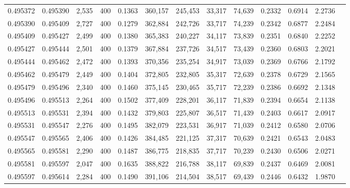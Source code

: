 \begin{tabular}{rrrrrrrrrrrrr}
0.495372 & 0.495390 &  2,535 & 400 &                                     0.1363 & 360,157 & 245,453 &  33,317 &  74,639 & 0.2332 & 0.6914 & 2.2736 \\
0.495390 & 0.495409 &  2,727 & 400 &                                     0.1279 & 362,884 & 242,726 &  33,717 &  74,239 & 0.2342 & 0.6877 & 2.2484 \\
0.495409 & 0.495427 &  2,499 & 400 &                                     0.1380 & 365,383 & 240,227 &  34,117 &  73,839 & 0.2351 & 0.6840 & 2.2252 \\
0.495427 & 0.495444 &  2,501 & 400 &                                     0.1379 & 367,884 & 237,726 &  34,517 &  73,439 & 0.2360 & 0.6803 & 2.2021 \\
0.495444 & 0.495462 &  2,472 & 400 &                                     0.1393 & 370,356 & 235,254 &  34,917 &  73,039 & 0.2369 & 0.6766 & 2.1792 \\
0.495462 & 0.495479 &  2,449 & 400 &                                     0.1404 & 372,805 & 232,805 &  35,317 &  72,639 & 0.2378 & 0.6729 & 2.1565 \\
0.495479 & 0.495496 &  2,340 & 400 &                                     0.1460 & 375,145 & 230,465 &  35,717 &  72,239 & 0.2386 & 0.6692 & 2.1348 \\
0.495496 & 0.495513 &  2,264 & 400 &                                     0.1502 & 377,409 & 228,201 &  36,117 &  71,839 & 0.2394 & 0.6654 & 2.1138 \\
0.495513 & 0.495531 &  2,394 & 400 &                                     0.1432 & 379,803 & 225,807 &  36,517 &  71,439 & 0.2403 & 0.6617 & 2.0917 \\
0.495531 & 0.495547 &  2,276 & 400 &                                     0.1495 & 382,079 & 223,531 &  36,917 &  71,039 & 0.2412 & 0.6580 & 2.0706 \\
0.495547 & 0.495565 &  2,406 & 400 &                                     0.1426 & 384,485 & 221,125 &  37,317 &  70,639 & 0.2421 & 0.6543 & 2.0483 \\
0.495565 & 0.495581 &  2,290 & 400 &                                     0.1487 & 386,775 & 218,835 &  37,717 &  70,239 & 0.2430 & 0.6506 & 2.0271 \\
0.495581 & 0.495597 &  2,047 & 400 &                                     0.1635 & 388,822 & 216,788 &  38,117 &  69,839 & 0.2437 & 0.6469 & 2.0081 \\
0.495597 & 0.495614 &  2,284 & 400 &                                     0.1490 & 391,106 & 214,504 &  38,517 &  69,439 & 0.2446 & 0.6432 & 1.9870 \\

\end{tabular}
